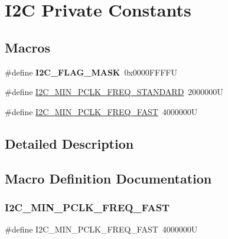 \hypertarget{group___i2_c___private___constants}{}\section{I2C Private Constants}
\label{group___i2_c___private___constants}
\subsection*{Macros}
\begin{DoxyCompactItemize}
\item 
\mbox{\label{group___i2_c___private___constants_gafbc0a6e4113be03100fbae1314a8b395}} 
\#define {\bfseries I2\+C\+\_\+\+F\+L\+A\+G\+\_\+\+M\+A\+SK}~0x0000\+F\+F\+F\+FU
\item 
\#define \hyperlink{group___i2_c___private___constants_ga6c86f9bd6ba54caa5cd13163ae49f753}{I2\+C\+\_\+\+M\+I\+N\+\_\+\+P\+C\+L\+K\+\_\+\+F\+R\+E\+Q\+\_\+\+S\+T\+A\+N\+D\+A\+RD}~2000000U
\item 
\#define \hyperlink{group___i2_c___private___constants_gacda1638db89dd9edf880f012ec185bac}{I2\+C\+\_\+\+M\+I\+N\+\_\+\+P\+C\+L\+K\+\_\+\+F\+R\+E\+Q\+\_\+\+F\+A\+ST}~4000000U
\end{DoxyCompactItemize}


\subsection{Detailed Description}


\subsection{Macro Definition Documentation}
\mbox{\label{group___i2_c___private___constants_gacda1638db89dd9edf880f012ec185bac}} 
\subsubsection{\texorpdfstring{I2\+C\+\_\+\+M\+I\+N\+\_\+\+P\+C\+L\+K\+\_\+\+F\+R\+E\+Q\+\_\+\+F\+A\+ST}{I2C\_MIN\_PCLK\_FREQ\_FAST}}
{\footnotesize\ttfamily \#define I2\+C\+\_\+\+M\+I\+N\+\_\+\+P\+C\+L\+K\+\_\+\+F\+R\+E\+Q\+\_\+\+F\+A\+ST~4000000U}

